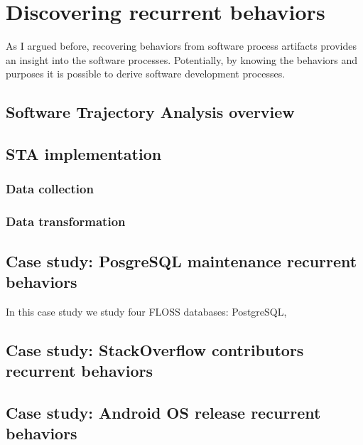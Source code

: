 \chapter{Discovering recurrent behaviors}\label{chapter_sta}
As I argued before, recovering behaviors from software process artifacts provides an insight into the 
software processes. Potentially, by knowing the behaviors and purposes it is possible to derive software 
development processes. 

\section{Software Trajectory Analysis overview}
\section{STA implementation}
\subsection{Data collection}
\subsection{Data transformation}
\section{Case study: PosgreSQL maintenance recurrent behaviors}
In this case study we study four FLOSS databases: PostgreSQL,
\section{Case study: StackOverflow contributors recurrent behaviors}
\section{Case study: Android OS release recurrent behaviors}
